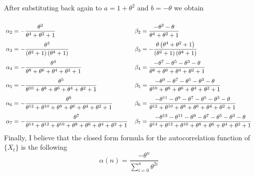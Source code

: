 After substituting back again to $a = 1+\theta^2$ and $b = -\theta$ we obtain

\[ \everymath{\displaystyle}\arraycolsep=2.8pt\def\arraystretch{2.5}\begin{array}{lcl}
    \alpha_{2} = - \frac{\theta^{2}}{\theta^{4} + \theta^{2} + 1}& & \beta_{2} = \frac{- \theta^{3} - \theta}{\theta^{4} + \theta^{2} + 1}\\
    \alpha_{3} = - \frac{\theta^{3}}{\left(\theta^{2} + 1\right) \left(\theta^{4} + 1\right)}& & \beta_{3} = - \frac{\theta \left(\theta^{4} + \theta^{2} + 1\right)}{\left(\theta^{2} + 1\right) \left(\theta^{4} + 1\right)}\\
    \alpha_{4} = - \frac{\theta^{4}}{\theta^{8} + \theta^{6} + \theta^{4} + \theta^{2} + 1}& & \beta_{4} = \frac{- \theta^{7} - \theta^{5} - \theta^{3} - \theta}{\theta^{8} + \theta^{6} + \theta^{4} + \theta^{2} + 1}\\
    \alpha_{5} = - \frac{\theta^{5}}{\theta^{10} + \theta^{8} + \theta^{6} + \theta^{4} + \theta^{2} + 1}& & \beta_{5} = \frac{- \theta^{9} - \theta^{7} - \theta^{5} - \theta^{3} - \theta}{\theta^{10} + \theta^{8} + \theta^{6} + \theta^{4} + \theta^{2} + 1}\\
    \alpha_{6} = - \frac{\theta^{6}}{\theta^{12} + \theta^{10} + \theta^{8} + \theta^{6} + \theta^{4} + \theta^{2} + 1}& & \beta_{6} = \frac{- \theta^{11} - \theta^{9} - \theta^{7} - \theta^{5} - \theta^{3} - \theta}{\theta^{12} + \theta^{10} + \theta^{8} + \theta^{6} + \theta^{4} + \theta^{2} + 1}\\
    \alpha_{7} = - \frac{\theta^{7}}{\theta^{14} + \theta^{12} + \theta^{10} + \theta^{8} + \theta^{6} + \theta^{4} + \theta^{2} + 1}& & \beta_{7} = \frac{- \theta^{13} - \theta^{11} - \theta^{9} - \theta^{7} - \theta^{5} - \theta^{3} - \theta}{\theta^{14} + \theta^{12} + \theta^{10} + \theta^{8} + \theta^{6} + \theta^{4} + \theta^{2} + 1}\\
\end{array} \]
\newpage
Finally, I believe that the closed form formula for the autocorrelation function of $\{X_t\}$ is the following
\[ \alpha(n) = \frac{-\theta^n}{\sum_{i = 0}^n \theta^{2i}} \]